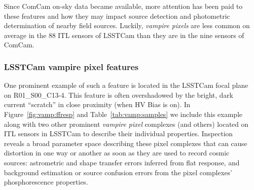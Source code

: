 Since ComCam on-sky data became available, more attention has been paid to these features and how they may impact source detection and photometric determination of nearby field sources. Luckily, {\it vampire pixels} are less common on average in the 88 ITL sensors of LSSTCam than they are in the nine sensors of ComCam. 

\subsubsection{LSSTCam vampire pixel
features}\label{lsstcam-vampire-pixel-features}

One prominent example of such a feature is located in the LSSTCam focal plane on R01\_S00\_C13-4. This feature is often overshadowed by the bright, dark current ``scratch'' in close proximity (when HV Bias is on). In Figure~\ref{fig:vamp:ffresp} and Table~\ref{tab:vamp:samples} we include this example along with two other prominent {\it vampire pixel} complexes (and others) located on ITL sensors in LSSTCam to describe their individual properties. Inspection reveals a broad parameter space describing these pixel complexes that can cause distortion in one way or another as soon as they are used to record cosmic sources: astrometric and shape transfer errors inferred from flat response, and background estimation or source confusion errors from the pixel complexes' phosphorescence properties.





